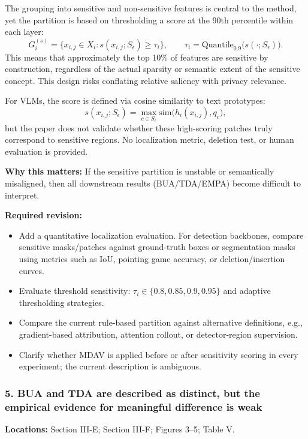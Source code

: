 The grouping into sensitive and non-sensitive features is central to the method, yet the partition is based on thresholding a score at the 90th percentile within each layer:
\begin{equation}
G_i^{(s)} = \{x_{i,j} \in X_i : s(x_{i,j}; S_{\epsilon}) \ge \tau_i\},
\qquad
\tau_i = \mathrm{Quantile}_{0.9}\big(s(\cdot; S_{\epsilon})\big).
\end{equation}
This means that approximately the top 10\% of features are sensitive by construction, regardless of the actual sparsity or semantic extent of the sensitive concept. This design risks conflating relative saliency with privacy relevance.

For VLMs, the score is defined via cosine similarity to text prototypes:
\begin{equation}
 s(x_{i,j}; S_{\epsilon}) = \max_{c \in S_{\epsilon}} \mathrm{sim}\big(h_i(x_{i,j}), q_c\big),
\end{equation}
but the paper does not validate whether these high-scoring patches truly correspond to sensitive regions. No localization metric, deletion test, or human evaluation is provided.

\textbf{Why this matters:} If the sensitive partition is unstable or semantically misaligned, then all downstream results (BUA/TDA/EMPA) become difficult to interpret.

\textbf{Required revision:}
\begin{itemize}
    \item Add a quantitative localization evaluation. For detection backbones, compare sensitive masks/patches against ground-truth boxes or segmentation masks using metrics such as IoU, pointing game accuracy, or deletion/insertion curves.
    \item Evaluate threshold sensitivity: $\tau_i \in \{0.8, 0.85, 0.9, 0.95\}$ and adaptive thresholding strategies.
    \item Compare the current rule-based partition against alternative definitions, e.g., gradient-based attribution, attention rollout, or detector-region supervision.
    \item Clarify whether MDAV is applied before or after sensitivity scoring in every experiment; the current description is ambiguous.
\end{itemize}

\subsubsection*{5. BUA and TDA are described as distinct, but the empirical evidence for meaningful difference is weak}
\textbf{Locations:} Section III-E; Section III-F; Figures 3--5; Table V.


